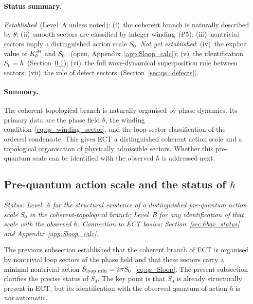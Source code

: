 \paragraph{Status summary.}
\textit{Established}~(Level~A unless noted):
(i)~the coherent branch is naturally described by $\theta$;
(ii)~smooth sectors are classified by integer winding~(P5);
(iii)~nontrivial sectors imply a distinguished action scale $S_0$.
\textit{Not yet established}:
(iv)~the explicit value of $K_\theta^{\rm eff}$ and $S_0$
~(open, Appendix~\ref{app:Sloop_calc});
(v)~the identification $S_0=\hbar$~(Section~\ref{sec:qs_hbar});
(vi)~the full wave-dynamical superposition rule between sectors;
(vii)~the role of defect sectors~(Section~\ref{sec:qs_defects}).

\paragraph{Summary.}
The coherent-topological branch is naturally organised by phase
dynamics.
Its primary data are the phase field $\theta$, the winding
condition~\eqref{eq:qs_winding_sector}, and the loop-sector
classification of the ordered condensate.
This gives ECT a distinguished coherent action scale and a topological
organisation of physically admissible sectors.
Whether this pre-quantum scale can be identified with the observed
$\hbar$ is addressed next.

\subsection{Pre-quantum action scale and the status of
  \texorpdfstring{$\hbar$}{hbar}}
\label{sec:qs_hbar}

\textit{Status: Level~A for the structural existence of a distinguished
pre-quantum action scale $S_0$ in the coherent-topological branch;
Level~B for any identification of that scale with the observed $\hbar$.
Connection to ECT basics: Section~\ref{sec:hbar_status} and
Appendix~\ref{app:Sloop_calc}.}

\medskip
The previous subsection established that the coherent branch of ECT
is organised by nontrivial loop sectors of the phase field and that
these sectors carry a minimal nontrivial action
$S_{\rm loop,min}=2\pi S_0$~\eqref{eq:qs_Sloop}.
The present subsection clarifies the precise status of $S_0$.
The key point is that $S_0$ is already structurally present in ECT,
but its identification with the observed quantum of action $\hbar$ is
\emph{not} automatic.

